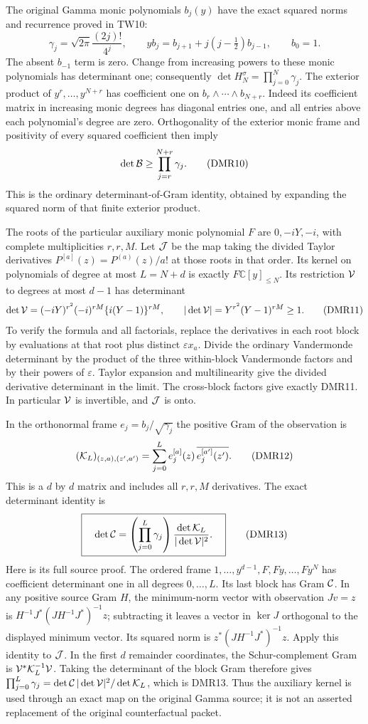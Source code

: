 \documentclass[11pt,a4paper]{article}
\begin{document}
The original Gamma monic polynomials $b_j(y)$ have the exact
squared norms and recurrence proved in TW10:
\[
 \gamma_j=\sqrt{2\pi}\frac{(2j)!}{4^j},\qquad
 yb_j=b_{j+1}+j(j-\tfrac12)b_{j-1},\qquad b_0=1.
 \tag{DMR9}
\]
The absent $b_{-1}$ term is zero. Change from increasing powers to
these monic polynomials has determinant one; consequently
$\det H_N^\sigma=\prod_{j=0}^N\gamma_j$.
The exterior product of $y^r,\ldots,y^{N+r}$ has coefficient one
on $b_r\wedge\cdots\wedge b_{N+r}$. Indeed its coefficient matrix
in increasing monic degrees has diagonal entries one, and all
entries above each polynomial's degree are zero. Orthogonality
of the exterior monic frame and positivity of every squared
coefficient then imply
\[
 \det{\cal B}\geq\prod_{j=r}^{N+r}\gamma_j .
 \tag{DMR10}
\]
This is the ordinary determinant-of-Gram identity, obtained by
expanding the squared norm of that finite exterior product.

The roots of the particular auxiliary monic polynomial $F$ are
$0,-iY,-i$, with complete multiplicities $r,r,M$. Let $ {\cal J}$
be the map taking the divided Taylor derivatives
$P^{[a]}(z)=P^{(a)}(z)/a!$ at those roots in that order. Its kernel
on polynomials of degree at most $L=N+d$ is exactly
$F\mathbb C[y]_{\leq N}$. Its restriction $ {\cal V}$ to degrees
at most $d-1$ has determinant
\[
 \det{\cal V}=
  (-iY)^{r^2}(-i)^{rM}\{i(Y-1)\}^{rM},\qquad
 |\det{\cal V}|=Y^{r^2}(Y-1)^{rM}\geq1.
 \tag{DMR11}
\]
To verify the formula and all factorials, replace the derivatives
in each root block by evaluations at that root plus distinct
$\varepsilon x_a$. Divide the ordinary Vandermonde determinant
by the product of the three within-block Vandermonde factors
and by their powers of $\varepsilon$. Taylor expansion and
multilinearity give the divided derivative determinant in the
limit. The cross-block factors give exactly DMR11. In particular
$ {\cal V}$ is invertible, and $ {\cal J}$ is onto.

In the orthonormal frame $e_j=b_j/\sqrt{\gamma_j}$ the positive
Gram of the observation is
\[
 ({\cal K}_L)_{(z,a),(z',a')}=
       \sum_{j=0}^L e_j^{[a]}(z)\,
                       \overline{e_j^{[a']}(z')}.
 \tag{DMR12}
\]
This is a $d$ by $d$ matrix and includes all $r,r,M$ derivatives.
The exact determinant identity is
\[
 \boxed{\quad
 \det{\cal C}=
       \left(\prod_{j=0}^L\gamma_j\right)
          \frac{\det{\cal K}_L}{|\det{\cal V}|^2}.
 \quad}\tag{DMR13}
\]
Here is its full source proof. The ordered frame
$1,\ldots,y^{d-1},F,Fy,\ldots,Fy^N$ has coefficient determinant
one in all degrees $0,\ldots,L$. Its last block has Gram
$ {\cal C}$. In any positive source Gram $H$, the minimum-norm
vector with observation $Jv=z$ is
$H^{-1}J^*(JH^{-1}J^*)^{-1}z$; subtracting it leaves a vector
in $\ker J$ orthogonal to the displayed minimum vector.
Its squared norm is $z^*(JH^{-1}J^*)^{-1}z$.
Apply this identity to $ {\cal J}$. In the first $d$ remainder
coordinates, the Schur-complement Gram is
$ {\cal V}^*{\cal K}_L^{-1}{\cal V}$.
Taking the determinant of the block Gram therefore gives
$\prod_{j=0}^L\gamma_j=\det{\cal C}\,
|\det{\cal V}|^2/\det{\cal K}_L$, which is DMR13.
Thus the auxiliary kernel is used through an exact map on the
original Gamma source; it is not an asserted replacement of
the original counterfactual packet.
\end{document}
